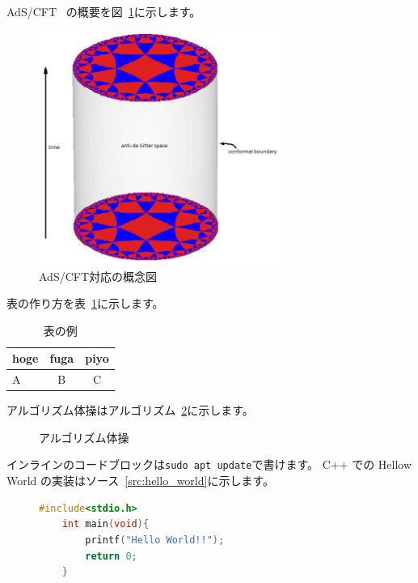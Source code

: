 \documentclass[a4paper,10pt]{ltjsarticle}
\begin{document}
AdS/CFT~\cite{maldacena1999large}
の概要を図~\ref{fig:adscft}に示します。
\begin{figure}[tbp]
  \begin{center}
    \includegraphics[width=8cm]{img/sample.png}
    \caption{AdS/CFT対応の概念図~\cite{adscftwiki}}
  \end{center}\label{fig:adscft}
\end{figure}
表の作り方を表~\ref{tab:sample}に示します。
\begin{table}[tbp]
  \begin{center}
    \caption{表の例}\label{tab:sample}
    \begin{tabular}{lcc}
      \toprule
      hoge & fuga & piyo \\
      \midrule
      A    & B    & C    \\
      \bottomrule
    \end{tabular}
  \end{center}
\end{table}
アルゴリズム体操はアルゴリズム~\ref{alg:excersise}に示します。
\begin{figure}[tbp]
  \begin{algorithm}[H]
    \caption{アルゴリズム体操}\label{alg:excersise}
    \begin{algorithmic}[1]
      \EndFor{}
      \EndFunction{}
    \end{algorithmic}
  \end{algorithm}
\end{figure}
インラインのコードブロックは\lstinline|sudo apt update|で書けます。
C++ での Hellow World の実装はソース~\ref{src:hello_world}に示します。
\begin{figure}
  \begin{lstlisting}[caption=Hello World,label={src:hello_world},language=C]
    #include<stdio.h>
    int main(void){
        printf("Hello World!!");
        return 0;
    }
  \end{lstlisting}
\end{figure}

\newpage

\end{document}
